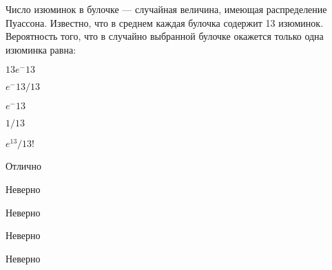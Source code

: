 
\begin{question}
Число изюминок в булочке — случайная величина, имеющая распределение
Пуассона. Известно, что в среднем каждая булочка содержит 13 изюминок.
Вероятность того, что в случайно выбранной булочке окажется только одна
изюминка равна:
\begin{answerlist}
  \item \(13e^-13\)
  \item \(e^-13/13\)
  \item \(e^-13\)
  \item \(1/13\)
  \item \(e^13/13!\)
\end{answerlist}
\end{question}

\begin{solution}
\begin{answerlist}
  \item Отлично
  \item Неверно
  \item Неверно
  \item Неверно
  \item Неверно
\end{answerlist}
\end{solution}

